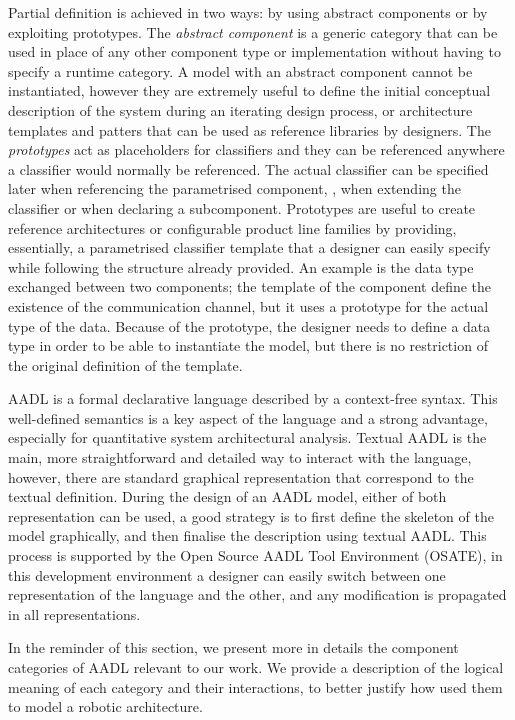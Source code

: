 Partial definition is achieved in two ways: by using abstract components or by exploiting prototypes. The \textit{abstract component} is a generic category that can be used in place of any other component type or implementation without having to specify a runtime category. A model with an abstract component cannot be instantiated, however they are extremely useful to define the initial conceptual description of the system during an iterating design process, or architecture templates and patters that can be used as reference libraries by designers. The \textit{prototypes} act as placeholders for classifiers and they can be referenced anywhere a classifier would normally be referenced. The actual classifier can be specified later when referencing the parametrised component, \eg, when extending the classifier or when declaring a subcomponent. Prototypes are useful to create reference architectures or configurable product line families by providing, essentially, a parametrised classifier template that a designer can easily specify while following the structure already provided. An example is the data type exchanged between two components; the template of the component define the existence of the communication channel, but it uses a prototype for the actual type of the data. Because of the prototype, the designer needs to define a data type in order to be able to instantiate the model, but there is no restriction of the original definition of the template.

AADL is a formal declarative language described by a context-free syntax. This well-defined semantics is a key aspect of the language and a strong advantage, especially for quantitative system architectural analysis. Textual AADL is the main, more straightforward and detailed way to interact with the language, however, there are standard graphical representation that correspond to the textual definition. During the design of an AADL model, either of both representation can be used, a good strategy is to first define the skeleton of the model graphically, and then finalise the description using textual AADL. This process is supported by the Open Source AADL Tool Environment (OSATE), in this development environment a designer can easily switch between one representation of the language and the other, and any modification is propagated in all representations.

In the reminder of this section, we present more in details the component categories of AADL relevant to our work. We provide a description of the logical meaning of each category and their interactions, to better justify how used them to model a robotic architecture.

